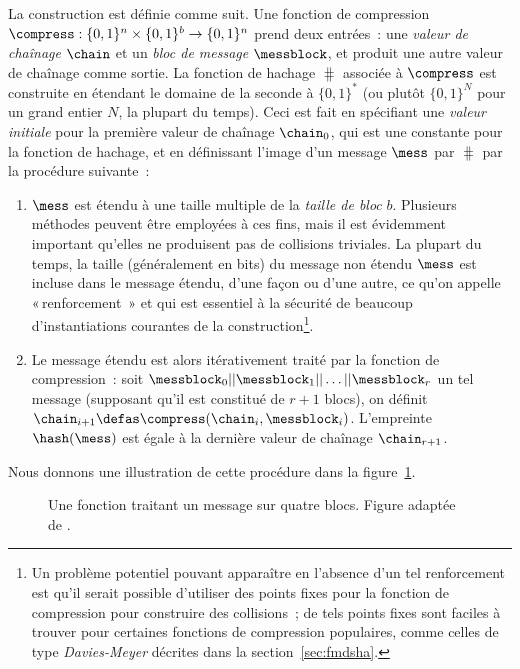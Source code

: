 La construction \merkdam est définie comme suit. Une fonction de compression
$\compress : \{0,1\}^n \times \{0,1\}^b \rightarrow \{0,1\}^n$
prend deux entrées~: une \emph{valeur de chaînage} $\chain$ et un \emph{bloc de message} $\messblock$, et produit une autre valeur de chaînage comme sortie.
La fonction de hachage
$\hash$ associée à $\compress$ est construite en étendant le domaine de la seconde à $\{0,1\}^*$ (ou plutôt $\{0,1\}^N$ pour un grand entier $N$, la plupart du temps).
Ceci est fait en spécifiant une \emph{valeur initiale} \iv pour la première valeur de chaînage
$\chain_0$, qui est une constante pour la fonction de hachage, et en définissant l'image d'un message
$\mess$ par $\hash$ par la procédure suivante~:
\begin{enumerate}
\item $\mess$ est étendu
à une taille multiple de la \emph{taille de bloc} $b$. Plusieurs méthodes peuvent être employées à ces fins, mais il est évidemment important
qu'elles ne produisent pas de collisions triviales. La plupart du temps, la taille (généralement en bits) du message non étendu
$\mess$ est incluse dans le message étendu, d'une façon ou d'une autre, ce qu'on appelle «\,renforcement \merkdam\,» et qui est essentiel
à la sécurité de beaucoup d'instantiations courantes de la construction\footnote{Un problème potentiel pouvant
apparaître en l'absence d'un tel renforcement est qu'il serait possible d'utiliser des points fixes pour la fonction de compression pour
construire des collisions~; de tels points fixes sont faciles à trouver pour certaines fonctions de compression populaires, comme celles de type
\emph{Davies-Meyer} décrites dans la section~\ref{sec:fmdsha}.}.
\item Le message étendu est alors itérativement traité par la fonction de compression~: soit
$\messblock_0||\messblock_1||\ldots||\messblock_r$ un tel message (supposant qu'il est constitué de
$r+1$ blocs), on définit $\chain_{i+1} \defas \compress(\chain_i, \messblock_i)$. L'empreinte $\hash(\mess)$ est égale à la dernière valeur de chaînage
$\chain_{r+1}$.
\end{enumerate}

Nous donnons une illustration de cette procédure dans la figure~\ref{fig:fmerk}.

\begin{figure}[!htb]
\begin{center}

\caption[Une fonction \merkdam traitant un message sur quatre blocs.]{Une fonction \merkdam traitant un message sur quatre blocs. Figure adaptée de \cite{TiKZ:Cryptographers}.\label{fig:fmerk}}
\end{center}
\end{figure} 


